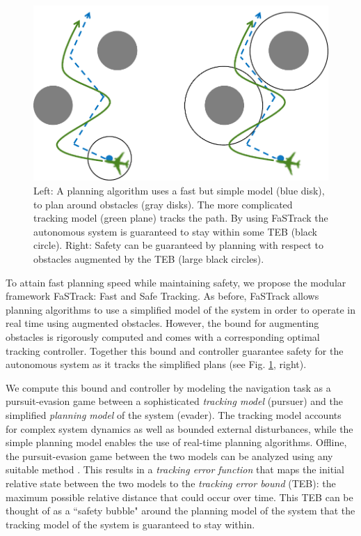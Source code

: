  \begin{figure}
 	\centering
 	\includegraphics[width=0.7\columnwidth]{fig/chasing}
 	\caption{Left: A planning algorithm uses a fast but simple model (blue disk), to plan around obstacles (gray disks). The more complicated tracking model (green plane) tracks the path. By using FaSTrack the autonomous system is guaranteed to stay within some TEB (black circle). Right: Safety can be guaranteed by planning with respect to obstacles augmented by the TEB (large black circles).}
 	\label{fig:chasing}
 \end{figure}

To attain fast planning speed while maintaining safety, we propose the modular framework FaSTrack: Fast and Safe Tracking.  As before, FaSTrack allows planning algorithms to use a simplified model of the system in order to operate in real time using augmented obstacles.  However, the bound for augmenting obstacles is rigorously computed and comes with a corresponding optimal tracking controller. Together this bound and controller guarantee safety for the autonomous system as it tracks the simplified plans (see Fig. \ref{fig:chasing}, right).  

We compute this bound and controller by modeling the navigation task as a pursuit-evasion game between a sophisticated \textit{tracking model} (pursuer) and the simplified \textit{planning model} of the system (evader). 
The tracking model accounts for complex system dynamics as well as bounded external disturbances, while the simple planning model enables the use of real-time planning algorithms. 
Offline, the pursuit-evasion game between the two models can be analyzed using any suitable method \cite{Mitchell05, SinghChenEtAl2018, royo2018classification}. 
This results in a \textit{tracking error function} that maps the initial relative state between the two models to the \textit{tracking error bound} (TEB): the maximum possible relative distance that could occur over time. 
This TEB can be thought of as a ``safety bubble" around the planning model of the system that the tracking model of the system is guaranteed to stay within.

